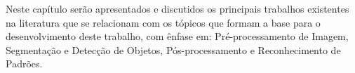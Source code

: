 \label{chapter:correlatos}

Neste capítulo serão apresentados e discutidos os principais trabalhos existentes na literatura que se relacionam com os tópicos que formam a base para o desenvolvimento deste trabalho, com ênfase em: Pré-processamento de Imagem, Segmentação e Detecção de Objetos, Pós-processamento e Reconhecimento de Padrões.



  



	

 




